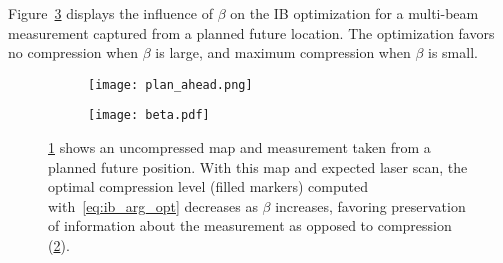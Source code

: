 



Figure~\ref{fig:loss_compression} displays the influence of $\beta$ on the IB optimization for a multi-beam measurement captured from a planned future location. The optimization favors no compression when $\beta$ is large, and maximum compression when $\beta$ is small.

\begin{figure}
    \centering
    \begin{subfigure}[t]{0.45\textwidth}
        \centering
        \texttt{[image: plan\_ahead.png]}
        \caption{\label{fig:loss_compression1}}
    \end{subfigure}
    \hfill
    \begin{subfigure}[t]{0.45\textwidth}
        \centering
        \texttt{[image: beta.pdf]}
        \caption{\label{fig:loss_compression2}}
    \end{subfigure}
    \caption[Information Bottleneck optimization for varying values of $\beta$]{\ref{fig:loss_compression1} shows an uncompressed map and measurement taken from a planned future position. With this map and expected laser scan, the optimal compression level (filled markers) computed with~\eqref{eq:ib_arg_opt} decreases as $\beta$ increases, favoring preservation of information about the measurement as opposed to compression (\ref{fig:loss_compression2}). \label{fig:loss_compression}}
\end{figure}


